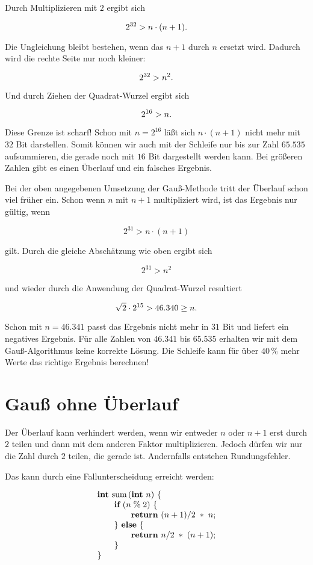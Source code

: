 Durch Multiplizieren mit $2$ ergibt sich

$$2^{32} > n\cdot(n+1)\hbox{.}$$

\noindent Die Ungleichung bleibt bestehen, wenn das $n+1$ durch $n$
ersetzt wird. Dadurch wird die rechte Seite nur noch kleiner:

$$2^{32} > n^2\hbox{.}$$

\noindent Und durch Ziehen der Quadrat-Wurzel ergibt sich

$$2^{16} > n\hbox{.}$$

\noindent Diese Grenze ist scharf! Schon mit $n=2^{16}$ läßt sich
$n\cdot(n+1)$ nicht mehr mit $32$ Bit darstellen.
Somit können wir auch mit der Schleife nur bis zur Zahl $65.535$
aufsummieren, die gerade noch mit $16$ Bit dargestellt werden kann.
Bei größeren Zahlen gibt es einen Überlauf und ein falsches Ergebnis.

Bei der oben angegebenen Umsetzung der Gauß-Methode tritt der
Überlauf schon viel früher ein.
Schon wenn $n$ mit $n+1$ multipliziert wird, ist das Ergebnis nur gültig,
wenn

$$2^{31}>n\cdot(n+1)$$

\noindent gilt.
Durch die gleiche Abschätzung wie oben ergibt sich

$$2^{31}>n^2$$

\noindent und wieder durch die Anwendung der Quadrat-Wurzel resultiert

$$\sqrt{2}\cdot2^{15}>46.340\geq n\hbox{.}$$

\noindent Schon mit $n=46.341$ passt das Ergebnis nicht mehr in $31$ Bit und liefert
ein negatives Ergebnis.
Für alle Zahlen von $46.341$ bis $65.535$ erhalten wir mit dem
Gauß-Algorithmus keine korrekte Lösung.
Die Schleife kann für über $40\,\%$ mehr Werte das richtige Ergebnis
berechnen!

\section{Gauß ohne Überlauf}%
%
Der Überlauf kann verhindert werden, wenn wir entweder $n$ oder
$n+1$ erst durch $2$ teilen und dann mit dem anderen Faktor
multiplizieren.
Jedoch dürfen wir nur die Zahl durch $2$ teilen, die gerade
ist.
Andernfalls entstehen Rundungsfehler.

Das kann durch eine Fallunterscheidung erreicht werden:

$$\vbox{\halign{#\hfil\cr
{\bf int} sum$\,$({\bf int} $n$) $\{$\cr
\qquad{\bf if} ($n\mathrel\% 2$) $\{$\cr
\qquad\qquad{\bf return} $(n + 1)/2\;*\;n$;\cr
\qquad$\}$ {\bf else} $\{$\cr
\qquad\qquad{\bf return} $n/2 \;*\; (n + 1)$;\cr
\qquad$\}$\cr
$\}$\cr}}$$

